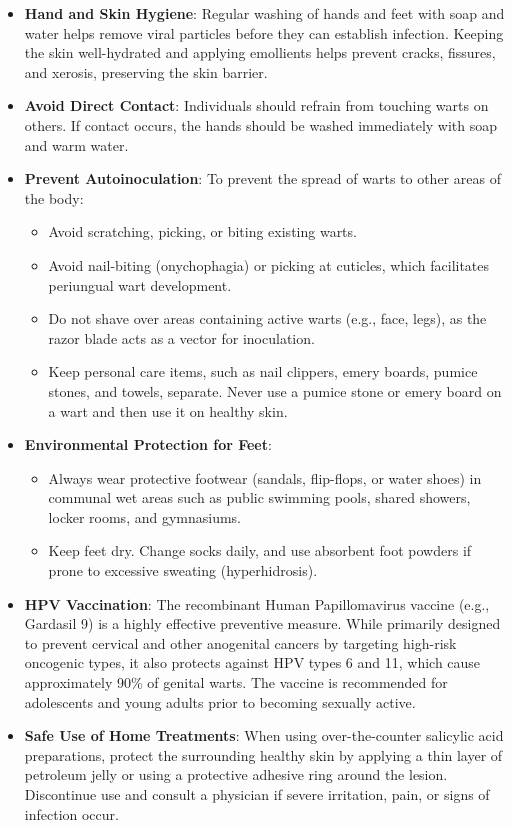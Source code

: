 \begin{itemize}
    \item \textbf{Hand and Skin Hygiene}: Regular washing of hands and feet with soap and water helps remove viral particles before they can establish infection. Keeping the skin well-hydrated and applying emollients helps prevent cracks, fissures, and xerosis, preserving the skin barrier.
    \item \textbf{Avoid Direct Contact}: Individuals should refrain from touching warts on others. If contact occurs, the hands should be washed immediately with soap and warm water.
    \item \textbf{Prevent Autoinoculation}: To prevent the spread of warts to other areas of the body:
    \begin{itemize}
        \item Avoid scratching, picking, or biting existing warts.
        \item Avoid nail-biting (onychophagia) or picking at cuticles, which facilitates periungual wart development.
        \item Do not shave over areas containing active warts (e.g., face, legs), as the razor blade acts as a vector for inoculation.
        \item Keep personal care items, such as nail clippers, emery boards, pumice stones, and towels, separate. Never use a pumice stone or emery board on a wart and then use it on healthy skin.
    \end{itemize}
    \item \textbf{Environmental Protection for Feet}:
    \begin{itemize}
        \item Always wear protective footwear (sandals, flip-flops, or water shoes) in communal wet areas such as public swimming pools, shared showers, locker rooms, and gymnasiums.
        \item Keep feet dry. Change socks daily, and use absorbent foot powders if prone to excessive sweating (hyperhidrosis).
    \end{itemize}
    \item \textbf{HPV Vaccination}: The recombinant Human Papillomavirus vaccine (e.g., Gardasil 9) is a highly effective preventive measure. While primarily designed to prevent cervical and other anogenital cancers by targeting high-risk oncogenic types, it also protects against HPV types 6 and 11, which cause approximately 90\% of genital warts. The vaccine is recommended for adolescents and young adults prior to becoming sexually active.
    \item \textbf{Safe Use of Home Treatments}: When using over-the-counter salicylic acid preparations, protect the surrounding healthy skin by applying a thin layer of petroleum jelly or using a protective adhesive ring around the lesion. Discontinue use and consult a physician if severe irritation, pain, or signs of infection occur.
\end{itemize}

